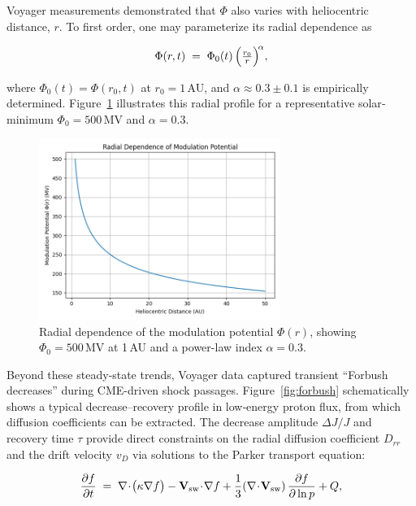 \documentclass[12pt]{report}
\begin{document}
Voyager measurements demonstrated that $\Phi$ also varies with heliocentric distance, $r$.  To first order, one may parameterize its radial dependence as

\begin{equation}
  \Phi(r,t) \;=\; \Phi_0(t)\,\Bigl(\tfrac{r_0}{r}\Bigr)^{\!\alpha},
  \label{eq:radial}
\end{equation}

\noindent where $\Phi_0(t)=\Phi(r_0,t)$ at $r_0=1\,$AU, and $\alpha\approx0.3\pm0.1$ is empirically determined.  Figure~\ref{fig:modpot} illustrates this radial profile for a representative solar‐minimum $\Phi_0=500\,$MV and $\alpha=0.3$.




\begin{figure}[ht]
  \centering
  \includegraphics[width=0.7\textwidth]{modulation_potential_plot.png}
  \caption{Radial dependence of the modulation potential $\Phi(r)$, showing 
           $\Phi_0=500\,$MV at 1\,AU and a power-law index $\alpha=0.3$.}
  \label{fig:modpot}
\end{figure}



Beyond these steady‐state trends, Voyager data captured transient “Forbush decreases” during CME-driven shock passages.  Figure~\ref{fig:forbush} schematically shows a typical decrease–recovery profile in low‐energy proton flux, from which diffusion coefficients can be extracted.  The decrease amplitude $\Delta J/J$ and recovery time $\tau$ provide direct constraints on the radial diffusion coefficient $D_{rr}$ and the drift velocity $v_D$ via solutions to the Parker transport equation:

\begin{equation}
  \frac{\partial f}{\partial t} \;=\; 
    \nabla\!\cdot\!\bigl(\kappa \nabla f\bigr)
    - \mathbf{V}_{\rm sw}\!\cdot\!\nabla f
    + \frac{1}{3}(\nabla\!\cdot\!\mathbf{V}_{\rm sw})
      \,\frac{\partial f}{\partial \ln p}
    + Q,
  \label{eq:parker}
\end{equation}
\end{document}
